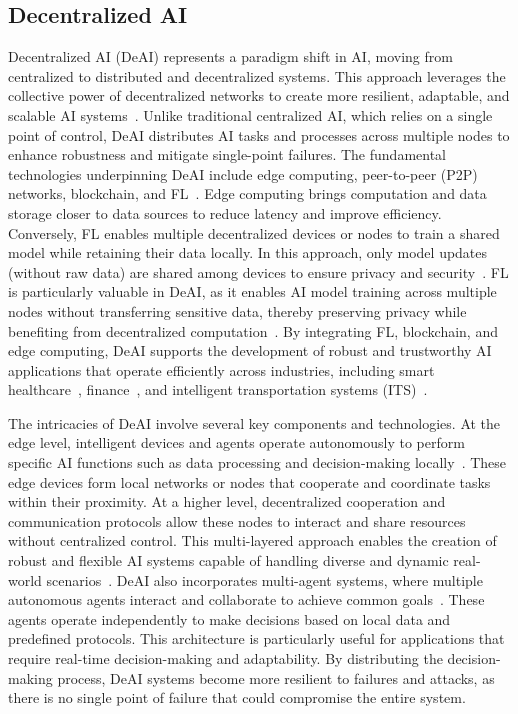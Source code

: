 \documentclass[5p,twocolumn]{elsarticle}
\begin{document}
\subsection{Decentralized AI}
Decentralized AI (DeAI) represents a paradigm shift in AI, moving from centralized to distributed and decentralized systems. This approach leverages the collective power of decentralized networks to create more resilient, adaptable, and scalable AI systems~\cite{kersic2024review}. Unlike traditional centralized AI, which relies on a single point of control, DeAI distributes AI tasks and processes across multiple nodes to enhance robustness and mitigate single-point failures. The fundamental technologies underpinning DeAI include edge computing, peer-to-peer (P2P) networks, blockchain, and FL~\cite{cao2022decentralized}. Edge computing brings computation and data storage closer to data sources to reduce latency and improve efficiency. Conversely, FL enables multiple decentralized devices or nodes to train a shared model while retaining their data locally. In this approach, only model updates (without raw data) are shared among devices to ensure privacy and security~\cite{jia2025comprehensive,thakur2025green}. FL is particularly valuable in DeAI, as it enables AI model training across multiple nodes without transferring sensitive data, thereby preserving privacy while benefiting from decentralized computation~\cite{shadmy2024reimagining}. By integrating FL, blockchain, and edge computing, DeAI supports the development of robust and trustworthy AI applications that operate efficiently across industries, including smart healthcare~\cite{egala2023fortified}, finance~\cite{zhang2021blockchain}, and intelligent transportation systems (ITS)~\cite{gu2023ai}.

The intricacies of DeAI involve several key components and technologies. At the edge level, intelligent devices and agents operate autonomously to perform specific AI functions such as data processing and decision-making locally~\cite{shao2023decentralized,karim2025ai}. These edge devices form local networks or nodes that cooperate and coordinate tasks within their proximity. At a higher level, decentralized cooperation and communication protocols allow these nodes to interact and share resources without centralized control. This multi-layered approach enables the creation of robust and flexible AI systems capable of handling diverse and dynamic real-world scenarios~\cite{zheng2024decentralized}. DeAI also incorporates multi-agent systems, where multiple autonomous agents interact and collaborate to achieve common goals~\cite{dorri2018multi}. These agents operate independently to make decisions based on local data and predefined protocols. This architecture is particularly useful for applications that require real-time decision-making and adaptability. By distributing the decision-making process, DeAI systems become more resilient to failures and attacks, as there is no single point of failure that could compromise the entire system.
\end{document}
